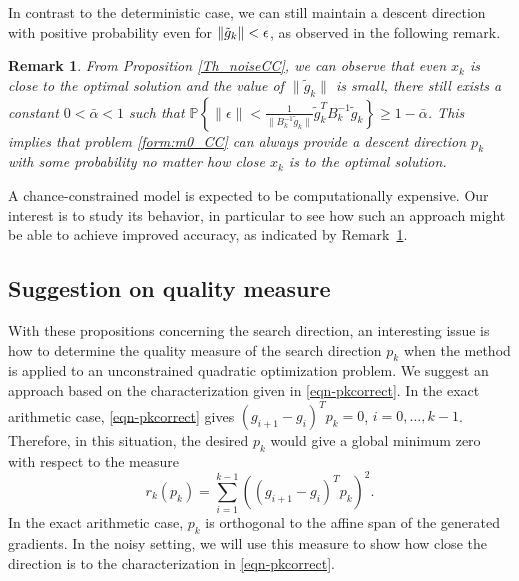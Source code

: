 \documentclass[11pt,twoside]{article}
\newtheorem{remark}{Remark}
\begin{document}
In contrast to the deterministic case, we can still maintain a descent
direction with positive probability even for $\|\tilde{g}_k\|< \epsilon$,
as observed in the following remark.

\begin{remark}\label{Remark_m2}
From Proposition \ref{Th_noiseCC}, we can observe that even $x_k$ is close to the optimal solution and the value of $\|\tilde{g}_k\|$ is small, there still exists a constant $0<\bar{\alpha}<1$ such that $\mathbb{P}\left\{\|\epsilon\| <  \frac{1}{\|B_k^{-1}\tilde{g}_k\|}\tilde{g}_k^TB_k^{-1}\tilde{g}_k\right\} \geq 1 - \bar{\alpha}$.
This implies that problem \eqref{form:m0_CC} can always provide a descent direction $p_k$ with some probability no matter how close $x_k$ is to the optimal solution.
\end{remark}

A chance-constrained model is expected to be computationally
expensive. Our interest is to study its behavior, in particular to
see how such an approach might be able to achieve improved accuracy,
as indicated by Remark~\ref{Remark_m2}.

\subsection{Suggestion on quality measure}

With these propositions concerning the search direction, an interesting
issue is how to determine the quality measure of the search direction
$p_k$ when the method is applied to an unconstrained quadratic
optimization problem.  We suggest an approach based on the
characterization given in \eqref{eqn-pkcorrect}. In the exact
arithmetic case, \eqref{eqn-pkcorrect} gives $(g_{i+1}-g_i)^T p_k =
0$, $i=0,\dots,k-1$. Therefore, in this situation, the desired $p_k$
would give a global minimum zero with respect to the measure
\begin{equation}\label{cg-objective}
r_k(p_k) = \sum_{i=1}^{k-1}\left( (g_{i+1}- g_i)^T p_k \right)^2.
\end{equation}
In the exact arithmetic case, $p_k$ is orthogonal to the affine span
of the generated gradients. In the noisy setting, we will use this
measure to show how close the direction is to the characterization in
\eqref{eqn-pkcorrect}.

\end{document}

